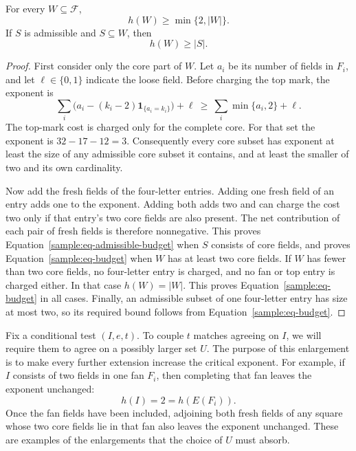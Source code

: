 \begin{lemma}\label{sample:lem-budget}
For every $W\subseteq\mathcal F$,
\begin{equation}\label{sample:eq-budget}
h(W)\geq\min\{2,|W|\}.
\end{equation}
If $S$ is admissible and $S\subseteq W$, then
\begin{equation}\label{sample:eq-admissible-budget}
h(W)\geq |S|.
\end{equation}
\end{lemma}
\begin{proof}
First consider only the core part of $W$.  Let $a_i$ be its number of
fields in $F_i$, and let $\ell\in\{0,1\}$ indicate the loose field.
Before charging the top mark, the exponent is
\[
\sum_i\bigl(a_i-(k_i-2)\mathbf 1_{\{a_i=k_i\}}\bigr)+\ell
\ \geq\ \sum_i\min\{a_i,2\}+\ell.
\]
The top-mark cost is charged only for the complete core.  For that set
the exponent is $32-17-12=3$.  Consequently every core subset has
exponent at least the size of any admissible core subset it contains,
and at least the smaller of two and its own cardinality.

Now add the fresh fields of the four-letter entries.  Adding one fresh
field of an entry adds one to the exponent.  Adding both adds two and
can charge the cost two only if that entry's two core fields are also
present.  The net contribution of each pair of fresh fields is therefore
nonnegative.  This proves Equation~\eqref{sample:eq-admissible-budget}
when $S$ consists of core fields, and proves
Equation~\eqref{sample:eq-budget} when $W$ has at least two core fields.
If $W$ has fewer than two core fields, no four-letter entry is charged,
and no fan or top entry is charged either.  In that case $h(W)=|W|$.
This proves Equation~\eqref{sample:eq-budget} in all cases.  Finally,
an admissible subset of one four-letter entry has size at most two, so
its required bound follows from Equation~\eqref{sample:eq-budget}.
\end{proof}

Fix a conditional test $(I,e,t)$.  To couple $t$ matches agreeing on
$I$, we will require them to agree on a possibly larger set $U$.
The purpose of this enlargement is to make every further extension
increase the critical exponent.  For example, if $I$ consists of two
fields in one fan $F_i$, then completing that fan leaves the exponent
unchanged:
\[
h(I)=2=h(E(F_i)).
\]
Once the fan fields have been included, adjoining both fresh fields of
any square whose two core fields lie in that fan also leaves the exponent
unchanged.  These are examples of the enlargements that the choice of
$U$ must absorb.

